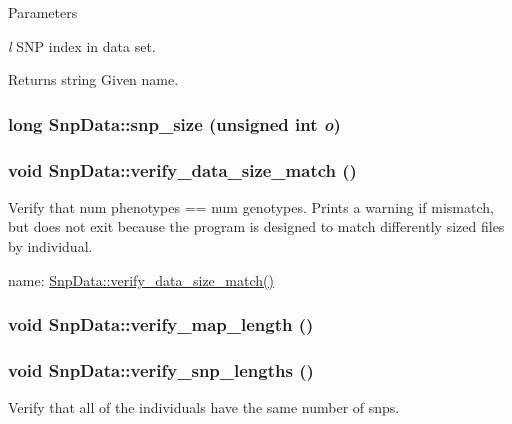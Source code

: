 \begin{DoxyParams}{Parameters}
\item[{\em l}]SNP index in data set. \end{DoxyParams}
\begin{DoxyReturn}{Returns}
string Given name. 
\end{DoxyReturn}
\hypertarget{classSnpData_a391d4c15ba2ee87318ffbb6b2f20b890}{
\subsubsection[{snp\_\-size}]{\setlength{\rightskip}{0pt plus 5cm}long SnpData::snp\_\-size (unsigned int {\em o})}}
\label{classSnpData_a391d4c15ba2ee87318ffbb6b2f20b890}
\hypertarget{classSnpData_a726282a904cee0968dae7ef614ea16fe}{
\subsubsection[{verify\_\-data\_\-size\_\-match}]{\setlength{\rightskip}{0pt plus 5cm}void SnpData::verify\_\-data\_\-size\_\-match ()}}
\label{classSnpData_a726282a904cee0968dae7ef614ea16fe}
Verify that num phenotypes == num genotypes. Prints a warning if mismatch, but does not exit because the program is designed to match differently sized files by individual.

name: \hyperlink{classSnpData_a726282a904cee0968dae7ef614ea16fe}{SnpData::verify\_\-data\_\-size\_\-match()} \hypertarget{classSnpData_ab0b29e53a209df1996e3dc008afb2f5b}{
\subsubsection[{verify\_\-map\_\-length}]{\setlength{\rightskip}{0pt plus 5cm}void SnpData::verify\_\-map\_\-length ()}}
\label{classSnpData_ab0b29e53a209df1996e3dc008afb2f5b}
\hypertarget{classSnpData_a0762cd9f5ff8576c8d7aee9550201f01}{
\subsubsection[{verify\_\-snp\_\-lengths}]{\setlength{\rightskip}{0pt plus 5cm}void SnpData::verify\_\-snp\_\-lengths ()}}
\label{classSnpData_a0762cd9f5ff8576c8d7aee9550201f01}
Verify that all of the individuals have the same number of snps.

